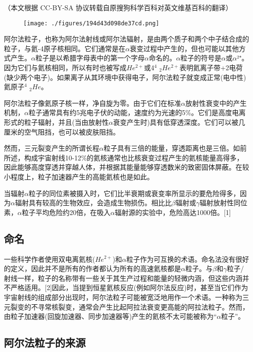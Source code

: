 
（本文根据 CC-BY-SA 协议转载自原搜狗科学百科对英文维基百科的翻译）

\begin{figure}[ht]
\centering
\texttt{[image: ./figures/194d43d098de37cd.png]}
\caption\label{fig_ALZ_6}
\end{figure}

阿尔法粒子，也称为阿尔法射线或阿尔法辐射，是由两个质子和两个中子结合成的粒子，与氦-4原子核相同。它们通常是在$\alpha$衰变过程中产生的，但也可能以其他方式产生。$\alpha$粒子是以希腊字母表中的第一个字母$\alpha$命名的。$\alpha$粒子的符号是$\alpha$或$\alpha$²⁺。因为它们与氦核相同，所以有时也被写成$He^{2+}$或4$^4$ $_2He^{2+}$表明氦离子带+2电荷(缺少两个电子)。如果离子从其环境中获得电子，阿尔法粒子就变成正常(电中性)氦原子$^4$ $_2He$。

阿尔法粒子像氦原子核一样，净自旋为零。由于它们在标准$\alpha$放射性衰变中的产生机制，$\alpha$粒子通常具有约5兆电子伏的动能，速度约为光速的5\%。它们是高度电离形式的粒子辐射，并且(当由放射性$\alpha$衰变产生时)具有低穿透深度。它们可以被几厘米的空气阻挡，也可以被皮肤阻挡。

然而，三元裂变产生的所谓长程$\alpha$粒子具有三倍的能量，穿透距离也是三倍。如前所述，构成宇宙射线10-12\%的氦核通常也比核衰变过程产生的氦核能量高得多，因此能够高度穿透并穿越人体，并根据其能量能够穿透数米的致密固体屏蔽。在较小程度上，粒子加速器产生的高能氦核也是如此。

当辐射$\alpha$粒子的同位素被摄入时，它们比半衰期或衰变率所显示的要危险得多，因为$\alpha$辐射具有较高的生物效应，会造成生物损伤。相比比$\beta$辐射或$\gamma$辐射放射性同位素，$\alpha$粒子平均危险约20倍，在吸入$\alpha$辐射源的实验中，危险高达1000倍。[1]

\subsection{命名}
一些科学作者使用双电离氦核($He^{2+}$)和$\alpha$粒子作为可互换的术语。命名法没有很好的定义，因此并不是所有的作者都认为所有的高速氦核都是$\alpha$粒子。与$\beta$和$\gamma$粒子/射线一样，粒子的名称带有一些关于其生产过程和能量的轻微内涵，但这些内涵并不严格适用。[2]因此，当提到恒星氦核反应(例如阿尔法反应)时，甚至当它们作为宇宙射线的组成部分出现时，阿尔法粒子可能被宽泛地用作一个术语。一种称为三元裂变的不寻常核裂变，通常会产生比起阿拉法衰变更高能的阿拉法粒子。然而，由粒子加速器(回旋加速器、同步加速器等)产生的氦核不太可能被称为“$\alpha$粒子”。

\subsection{阿尔法粒子的来源}
